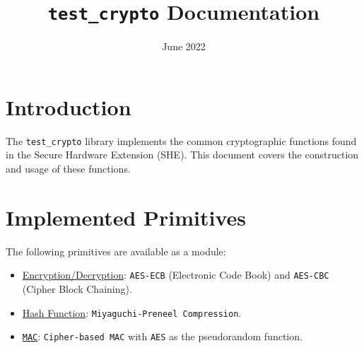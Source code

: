 \documentclass{article}
\title{\texttt{test\_crypto} Documentation}
\date{June 2022}
\begin{document}
	
	\maketitle
	
	\section{Introduction}
	The \texttt{test\_crypto} library implements the common cryptographic functions found in the Secure Hardware Extension (SHE). This document covers the construction and usage of these functions. 
	
	\section{Implemented Primitives}
	The following primitives are available as a module:
	\begin{itemize}
		\item \underline{Encryption/Decryption}: \texttt{AES-ECB} (Electronic Code Book) and \texttt{AES-CBC} (Cipher Block Chaining).
		\item \underline{Hash Function}: \texttt{Miyaguchi-Preneel Compression}.
		\item \underline{\texttt{MAC}}: \texttt{Cipher-based MAC} with \texttt{AES} as the pseudorandom function.
	\end{itemize}
	
\end{document}
